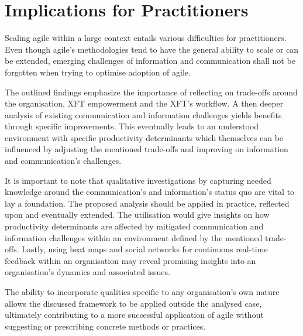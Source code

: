 \section{Implications for Practitioners}

Scaling agile within a large context entails various difficulties for practitioners. Even though agile's methodologies tend to have the general ability to scale or can be extended, emerging challenges of information and communication shall not be forgotten when trying to optimise adoption of agile.  

The outlined findings emphasize the importance of reflecting on trade-offs around the organisation, \ac{XFT} empowerment and the \ac{XFT}'s workflow. A then deeper analysis of existing communication and information challenges yields benefits through specific improvements. This eventually leads to an understood environment with specific productivity determinants which themselves can be influenced by adjusting the mentioned trade-offs and improving on information and communication's challenges.

It is important to note that qualitative investigations by capturing needed knowledge around the communication's and information's status quo are vital to lay a foundation. The proposed analysis should be applied in practice, reflected upon and eventually extended. The utilisation would give insights on how productivity determinants are affected by mitigated communication and information challenges within an environment defined by the mentioned trade-offs. Lastly, using heat maps and social networks for continuous real-time feedback within an organisation may reveal promising insights into an organisation's dynamics and associated issues.

The ability to incorporate qualities specific to any organisation's own nature allows the discussed framework to be applied outside the analysed case, ultimately contributing to a more successful application of agile without suggesting or prescribing concrete methods or practices.